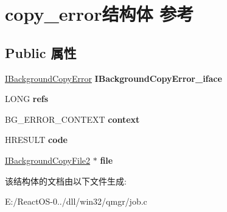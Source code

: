 \hypertarget{structcopy__error}{}\section{copy\+\_\+error结构体 参考}
\label{structcopy__error}
\subsection*{Public 属性}
\begin{DoxyCompactItemize}
\item 
\mbox{\label{structcopy__error_aa9ccf282076a34981eda27e347589556}} 
\hyperlink{interface_i_background_copy_error}{I\+Background\+Copy\+Error} {\bfseries I\+Background\+Copy\+Error\+\_\+iface}
\item 
\mbox{\label{structcopy__error_acccac212874de03ad860acc66a3e6642}} 
L\+O\+NG {\bfseries refs}
\item 
\mbox{\label{structcopy__error_ac8f39ec4c60f46cd9dd754476917772d}} 
B\+G\+\_\+\+E\+R\+R\+O\+R\+\_\+\+C\+O\+N\+T\+E\+XT {\bfseries context}
\item 
\mbox{\label{structcopy__error_a90e41cdcfea700150c972837bcd5034a}} 
H\+R\+E\+S\+U\+LT {\bfseries code}
\item 
\mbox{\label{structcopy__error_a804652aeb0793b8c18767dbfe5523ea0}} 
\hyperlink{interface_i_background_copy_file2}{I\+Background\+Copy\+File2} $\ast$ {\bfseries file}
\end{DoxyCompactItemize}


该结构体的文档由以下文件生成\+:\begin{DoxyCompactItemize}
\item 
E\+:/\+React\+O\+S-\/0../dll/win32/qmgr/job.\+c\end{DoxyCompactItemize}
